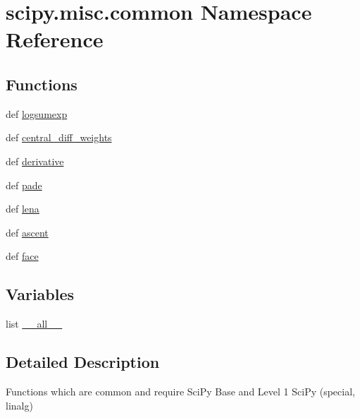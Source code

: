 \hypertarget{namespacescipy_1_1misc_1_1common}{}\section{scipy.\+misc.\+common Namespace Reference}
\label{namespacescipy_1_1misc_1_1common}
\subsection*{Functions}
\begin{DoxyCompactItemize}
\item 
def \hyperlink{namespacescipy_1_1misc_1_1common_a92c8a545c3ac958e10a6fb6d9f4155d6}{logsumexp}
\item 
def \hyperlink{namespacescipy_1_1misc_1_1common_a786c6e72f283d33c318fbbfef5716bd6}{central\+\_\+diff\+\_\+weights}
\item 
def \hyperlink{namespacescipy_1_1misc_1_1common_a26484f97dfdfdd1a44d979b97a7c0d0e}{derivative}
\item 
def \hyperlink{namespacescipy_1_1misc_1_1common_af99c9dbd04cec4d8f73dd1e44e391459}{pade}
\item 
def \hyperlink{namespacescipy_1_1misc_1_1common_a3e0a22dda6838093332b90e73f7268d1}{lena}
\item 
def \hyperlink{namespacescipy_1_1misc_1_1common_a11571d3f77f90275f6b2a4fc98ed2f09}{ascent}
\item 
def \hyperlink{namespacescipy_1_1misc_1_1common_a8ac8388cbd6e71b400b79b80ef776c67}{face}
\end{DoxyCompactItemize}
\subsection*{Variables}
\begin{DoxyCompactItemize}
\item 
list \hyperlink{namespacescipy_1_1misc_1_1common_af3c8b5b8e4d15979f1d1aa622587cfef}{\+\_\+\+\_\+all\+\_\+\+\_\+}
\end{DoxyCompactItemize}


\subsection{Detailed Description}
\begin{DoxyVerb}Functions which are common and require SciPy Base and Level 1 SciPy
(special, linalg)
\end{DoxyVerb}
 

